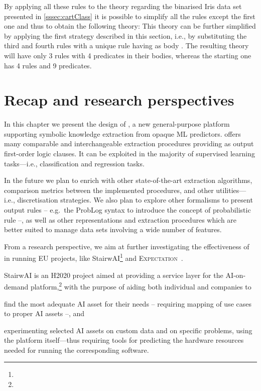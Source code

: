 \documentclass[12pt,a4paper,openright,twoside]{book}
\begin{document}
By applying all these rules to the theory regarding the binarised Iris data set presented in \cref{sssec:cartClass} it is possible to simplify all the rules except the first one and thus to obtain the following theory:
%
%
This theory can be further simplified by applying the first strategy described in this section, i.e., by substituting the third and fourth rules with a unique rule having as body .
%
The resulting theory will have only 3 rules with 4 predicates in their bodies, whereas the starting one has 4 rules and 9 predicates.

\section{Recap and research perspectives}\label{sec:conclusions2}

In this chapter we present the design of \psyke{}, a new general-purpose platform supporting symbolic knowledge extraction from opaque ML predictors.
%
\psyke{} offers many comparable and interchangeable extraction procedures providing as output first-order logic clauses.
%
It can be exploited in the majority of supervised learning tasks---i.e., classification and regression tasks.

In the future we plan to enrich \psyke{} with other state-of-the-art extraction algorithms, comparison metrics between the implemented procedures, and other utilities---i.e., discretisation strategies.
%
We also plan to explore other formalisms to present output rules -- e.g.\ the ProbLog syntax to introduce the concept of probabilistic rule --, as well as other representations and extraction procedures which are better suited to manage data sets involving a wide number of features.

From a research perspective, we aim at further investigating the effectiveness of \psyke{} in running EU projects, like StairwAI\footnote{} and \textsc{Expectation}~\cite{expectation-extraamas2021}.

StairwAI is an H2020 project aimed at providing a service layer for the AI-on-demand platform,\footnote{} with the purpose of aiding both individual and companies to
%
\begin{inlinelist}
    \item find the most adequate AI asset for their needs -- requiring mapping of use cases to proper AI assets --, and
    \item experimenting selected AI assets on custom data and on specific problems, using the platform itself---thus requiring tools for predicting the hardware resources needed for running the corresponding software.
\end{inlinelist}
\end{document}
